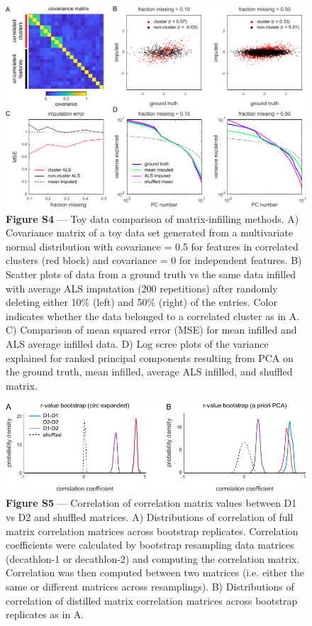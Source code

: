 \documentclass[12pt,letterpaper]{article}
\begin{document}
\begin{figure}[t!]
    \includegraphics[width=\textwidth]{../figures/chapter_3/fig_s4.pdf}
    \vspace{.05in}
    \caption*{\textbf{Figure S4} — Toy data comparison of matrix-infilling methods. A) Covariance matrix of a toy data set generated from a multivariate normal distribution with covariance = 0.5 for features in correlated clusters (red block) and covariance = 0 for independent features. B) Scatter plots of data from a ground truth vs the same data infilled with average ALS imputation (200 repetitions) after randomly deleting either 10\% (left) and 50\% (right) of the entries. Color indicates whether the data belonged to a correlated cluster as in A. C) Comparison of mean squared error (MSE) for mean infilled and ALS average infilled data. D) Log scree plots of the variance explained for ranked principal components resulting from PCA on the ground truth, mean infilled, average ALS infilled, and shuffled matrix.}
\end{figure}
\clearpage

\begin{figure}[t!]
    \includegraphics[width=\textwidth]{../figures/chapter_3/fig_s5.pdf}
    \vspace{.05in}
    \caption*{\textbf{Figure S5} — Correlation of correlation matrix values between D1 vs D2 and shuffled matrices. A) Distributions of correlation of full matrix correlation matrices across bootstrap replicates. Correlation coefficients were calculated by bootstrap resampling data matrices (decathlon-1 or decathlon-2) and computing the correlation matrix. Correlation was then computed between two matrices (i.e. either the same or different matrices across resamplings). B) Distributions of correlation of distilled matrix correlation matrices across bootstrap replicates as in A.}
\end{figure}
\clearpage
\end{document}
